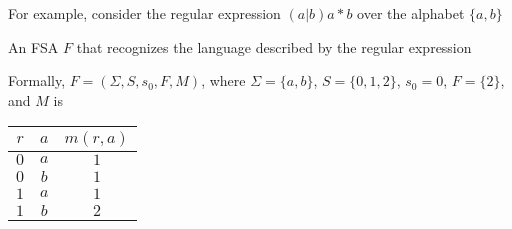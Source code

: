 \documentclass[8pt,a4paper,compress]{beamer}
\begin{document}
\begin{frame}[fragile]
\pause

For example, consider the regular expression $(a|b)a\!*\!b$ over the alphabet $\{a, b\}$

\pause\bigskip

An FSA $F$ that recognizes the language described by the regular expression

\begin{center}
\end{center}

\pause\bigskip
Formally, $F = (\Sigma, S, s_0, F, M)$, where $\Sigma = \{a, b\}$, $S = \{0, 1, 2\}$, $s_0 = 0$, $F = \{2\}$, and $M$ is
\begin{center}
\begin{tabular}{|c|c|c|} \hline
$r$ & $a$ & $m(r, a)$ \\ \hline \hline
$0$ & $a$ & $1$ \\ \hline
$0$ & $b$ & $1$ \\ \hline
$1$ & $a$ & $1$ \\ \hline
$1$ & $b$ & $2$ \\ \hline
\end{tabular}
\end{center}
\end{frame}
\end{document}
